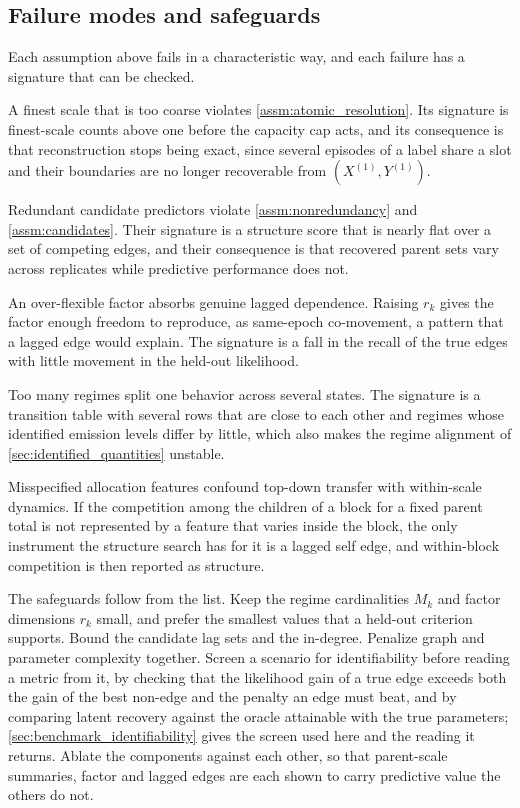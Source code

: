 \subsection{Failure modes and safeguards}
\label{sec:failure_modes}

Each assumption above fails in a characteristic way, and each failure has a
signature that can be checked.

A finest scale that is too coarse violates \cref{assm:atomic_resolution}. Its
signature is finest-scale counts above one before the capacity cap acts, and
its consequence is that reconstruction stops being exact, since several
episodes of a label share a slot and their boundaries are no longer recoverable
from $(X^{(1)}, Y^{(1)})$.

Redundant candidate predictors violate \cref{assm:nonredundancy} and
\cref{assm:candidates}. Their signature is a structure score that is nearly
flat over a set of competing edges, and their consequence is that recovered
parent sets vary across replicates while predictive performance does not.

An over-flexible factor absorbs genuine lagged dependence. Raising $r_k$ gives
the factor enough freedom to reproduce, as same-epoch co-movement, a pattern
that a lagged edge would explain. The signature is a fall in the recall of the
true edges with little movement in the held-out likelihood.

Too many regimes split one behavior across several states. The signature is a
transition table with several rows that are close to each other and regimes
whose identified emission levels differ by little, which also makes the regime
alignment of \cref{sec:identified_quantities} unstable.

Misspecified allocation features confound top-down transfer with within-scale
dynamics. If the competition among the children of a block for a fixed parent
total is not represented by a feature that varies inside the block, the only
instrument the structure search has for it is a lagged self edge, and
within-block competition is then reported as structure.

The safeguards follow from the list. Keep the regime cardinalities $M_k$ and
factor dimensions $r_k$ small, and prefer the smallest values that a held-out
criterion supports. Bound the candidate lag sets and the in-degree. Penalize
graph and parameter complexity together. Screen a scenario for identifiability
before reading a metric from it, by checking that the likelihood gain of a true
edge exceeds both the gain of the best non-edge and the penalty an edge must
beat, and by comparing latent recovery against the oracle attainable with the
true parameters; \cref{sec:benchmark_identifiability} gives the screen used
here and the reading it returns. Ablate the components against each other, so
that parent-scale summaries, factor and lagged edges are each shown to carry
predictive value the others do not.

